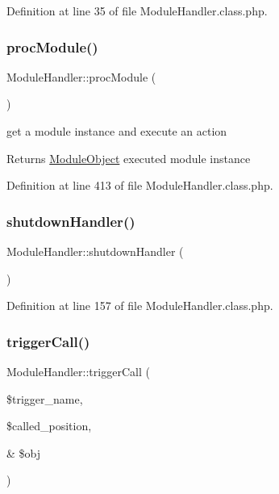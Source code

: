 Definition at line 35 of file Module\+Handler.\+class.\+php.

\hypertarget{classModuleHandler_a74ad0ae3090eff1da5a6e0e68ce431d0}{}\label{classModuleHandler_a74ad0ae3090eff1da5a6e0e68ce431d0} 
\subsubsection{\texorpdfstring{proc\+Module()}{procModule()}}
{\footnotesize\ttfamily Module\+Handler\+::proc\+Module (\begin{DoxyParamCaption}{ }\end{DoxyParamCaption})}

get a module instance and execute an action \begin{DoxyReturn}{Returns}
\hyperlink{classModuleObject}{Module\+Object} executed module instance 
\end{DoxyReturn}


Definition at line 413 of file Module\+Handler.\+class.\+php.

\hypertarget{classModuleHandler_a6295c502e315baa6c563f48ddf08e233}{}\label{classModuleHandler_a6295c502e315baa6c563f48ddf08e233} 
\subsubsection{\texorpdfstring{shutdown\+Handler()}{shutdownHandler()}}
{\footnotesize\ttfamily Module\+Handler\+::shutdown\+Handler (\begin{DoxyParamCaption}{ }\end{DoxyParamCaption})}



Definition at line 157 of file Module\+Handler.\+class.\+php.

\hypertarget{classModuleHandler_aa1b1f9eae91ccd76e6a81c9375c2e673}{}\label{classModuleHandler_aa1b1f9eae91ccd76e6a81c9375c2e673} 
\subsubsection{\texorpdfstring{trigger\+Call()}{triggerCall()}}
{\footnotesize\ttfamily Module\+Handler\+::trigger\+Call (\begin{DoxyParamCaption}\item[{}]{\$trigger\+\_\+name,  }\item[{}]{\$called\+\_\+position,  }\item[{\&}]{\$obj }\end{DoxyParamCaption})}

